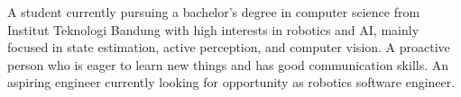 

\begin{cvparagraph}
A student currently pursuing a bachelor's degree in computer science from Institut Teknologi Bandung with high interests in robotics and AI, mainly focused in state estimation, active perception, and computer vision. A proactive person who is eager to learn new things and has good communication skills. An aspiring engineer currently looking for opportunity as robotics software engineer.
\end{cvparagraph}
